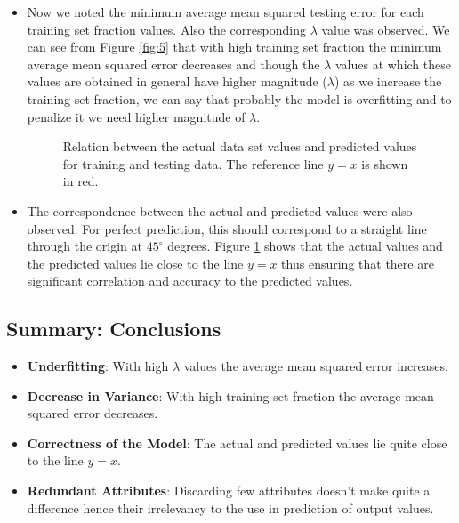 \documentclass{article}
\begin{document}
\begin{itemize}
\item Now we noted the minimum average mean squared testing error for each training set fraction values. Also the corresponding $\lambda$ value was observed. We can see from Figure \ref{fig:5} that with high training set fraction the minimum average mean squared error decreases and though the $\lambda$ values at which these values are obtained  in general have higher magnitude ($\lambda$) as we increase the training set fraction, we can say that probably the model is overfitting and to penalize it we need higher magnitude of $\lambda$.

\begin{figure}[H]
 \caption{Relation between the actual data set values and predicted values for training and testing data. The reference line $y=x$ is shown in red.}
 \label{fig:6}
 \end{figure}
 
\item The correspondence between the actual and predicted values were also observed. For perfect prediction, this should correspond to a straight line through the origin at $45^\circ$ degrees. Figure \ref{fig:6} shows that the actual values and the predicted values lie close to the line $y=x$ thus ensuring that there are significant correlation and accuracy to the predicted values.
 
\end{itemize}

\subsection*{Summary: Conclusions}
\begin{itemize}
\item {\bf Underfitting}: With high $\lambda$ values the average mean squared error increases.
\item {\bf Decrease in Variance}: With high training set fraction the average mean squared error decreases.
\item {\bf Correctness of the Model}: The actual and predicted values lie quite close to the line $y=x$.
\item {\bf Redundant Attributes}: Discarding few attributes doesn't make quite a difference hence their irrelevancy to the use in prediction of output values.
\end{itemize}
\end{document}
